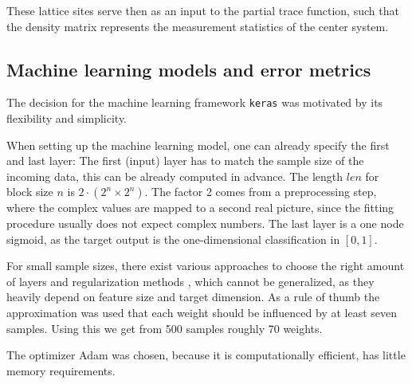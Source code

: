 \documentclass[reprint,amsmath,amssymb,aps,prb]{revtex4-2}
\begin{document}
These lattice sites serve then as an input to the partial trace function, such that the density matrix represents the measurement statistics of the center system.

\subsection{Machine learning models and error metrics}

The decision for the machine learning framework \texttt{keras} was motivated by its flexibility and simplicity. \cite{chollet2015keras}

When setting up the machine learning model, one can already specify the first and last layer: The first (input) layer has to match the sample size of the incoming data, this can be already computed in advance. The length $len$ for block size $n$ is $2\cdot\left(2^n\times 2^n \right)$. The factor 2 comes from a preprocessing step, where the complex values are mapped to a second real picture, since the fitting procedure usually does not expect complex numbers. The last layer is a one node sigmoid, as the target output is the one-dimensional classification in $\left[0,1\right]$.

For small sample sizes, there exist various approaches to choose the right amount of layers and regularization methods \cite{Olson2018,Feng2019}, which cannot be generalized, as they heavily depend on feature size and target dimension. As a rule of thumb the approximation was used that each weight should be influenced by at least seven samples. Using this we get from 500 samples roughly 70 weights.


The optimizer Adam was chosen, because it is computationally efficient,
has little memory requirements. \cite{Kingma2014}
\end{document}
